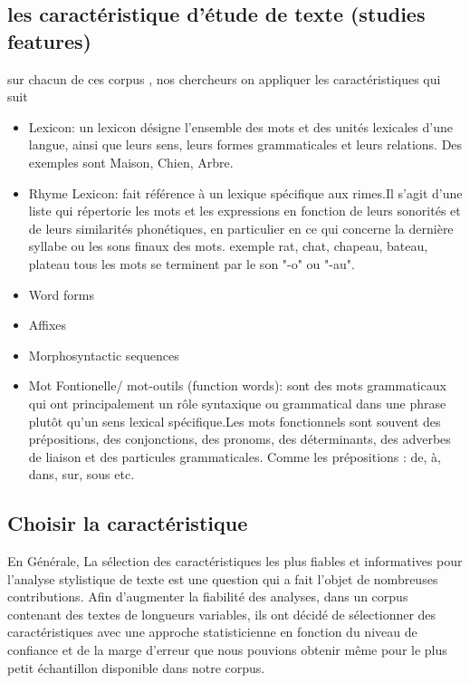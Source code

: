 \documentclass[]{report}
\begin{document}
\subsection{les caractéristique d'étude de texte (studies features)}
sur chacun de ces corpus , nos chercheurs on appliquer les caractéristiques qui suit
\begin{itemize}
	\item Lexicon: un lexicon désigne l'ensemble des mots et des unités lexicales d'une langue, ainsi que leurs sens, leurs formes grammaticales et leurs relations. Des exemples sont Maison, Chien, Arbre.
	\item Rhyme Lexicon: fait référence à un lexique spécifique aux rimes.Il s'agit d'une liste qui répertorie les mots et les expressions en fonction de leurs sonorités et de leurs similarités phonétiques, en particulier en ce qui concerne la dernière syllabe ou les sons finaux des mots. exemple  rat, chat, chapeau, bateau, plateau 	tous les mots se terminent par le son "-o" ou "-au".
	\item Word forms
	
	\item Affixes
	
	\item Morphosyntactic sequences 
	
	\item Mot Fontionelle/ mot-outils (function words): sont des mots grammaticaux qui ont principalement un rôle syntaxique ou grammatical dans une phrase plutôt qu'un sens lexical spécifique.Les mots fonctionnels sont souvent des prépositions, des conjonctions, des pronoms, des déterminants, des adverbes de liaison et des particules grammaticales. Comme les prépositions : de, à, dans, sur, sous etc.
\end{itemize}
\subsection{Choisir la caractéristique }
\vspace{\baselineskip}
\hspace{0,5cm} En Générale, La sélection des caractéristiques les plus fiables et informatives pour l'analyse stylistique de texte est une question qui a fait l'objet de nombreuses contributions.
Afin d'augmenter la fiabilité des analyses, dans un corpus contenant des textes de longueurs variables, 
ils ont décidé de sélectionner des caractéristiques  avec une approche  statisticienne
en fonction du niveau de confiance et de la marge d'erreur que nous pouvions obtenir même pour le plus petit échantillon disponible dans notre corpus.
\end{document}
